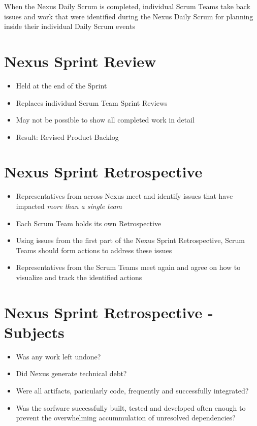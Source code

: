 \documentclass[a4paper,11pt,twocolumn]{article}
\begin{document}
\begin{tcolorbox}[colback=black!8!white,colframe=gray!50!black,title=Note,sharp corners,fonttitle=\normalsize\bfseries,fontupper=\normalsize]
	When the Nexus Daily Scrum is completed, individual Scrum Teams take back issues and work that were identified during the Nexus Daily Scrum for planning inside their individual Daily Scrum events
\end{tcolorbox}

\section*{Nexus Sprint Review}
\begin{itemize}
	\item Held at the end of the Sprint
	\item Replaces individual Scrum Team Sprint Reviews
	\item May not be possible to show all completed work in detail
	\item Result: Revised Product Backlog
\end{itemize}

\section*{Nexus Sprint Retrospective}
\begin{itemize}
	\item Representatives from across Nexus meet and identify issues that have impacted \textit{more than a single team}
	\item Each Scrum Team holds its own Retrospective
	\item Using issues from the first part of the Nexus Sprint Retrospective, Scrum Teams should form actions to address these issues
	\item Representatives from the Scrum Teams meet again and agree on how to visualize and track the identified actions
\end{itemize}

\section*{Nexus Sprint Retrospective - Subjects}
\begin{itemize}
	\item Was any work left undone?
	\item Did Nexus generate technical debt?
	\item Were all artifacts, paricularly code, frequently and successfully integrated?
	\item Was the sorfware successfully built, tested and developed often enough to prevent the overwhelming accummulation of unresolved dependencies?
\end{itemize}
\end{document}
